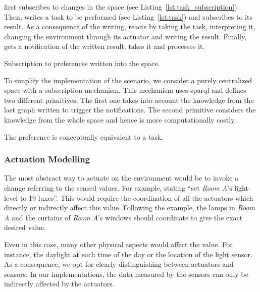 \nodeProvSpace{} first subscribes to changes in the space (see Listing~\ref{lst:task_subscription}).
Then, \nodeConsSpace{} writes a task to be performed (see Listing~\ref{lst:task}) and subscribes to its result.
As a consequence of the writing, \nodeProvSpace{} reacts by taking the task, interpreting it, changing the environment through its actuator and writing the result.
Finally, \nodeConsSpace{} gets a notification of the written result, takes it and processes it.


\begin{listing}
  
  \caption{Subscription to preferences written into the space.}
  \label{lst:task_subscription}
\end{listing}


To simplify the implementation of the scenario, we consider a purely centralized space with a subscription mechanism.
This mechanism uses \acs{sparql}  and defines two different primitives.
The first one takes into account the knowledge from the last graph written to trigger the notifications.
The second primitive considers the knowledge from the whole space and hence is more computationally costly.


\begin{listing}
  
  \caption{The preference is conceptually equivalent to a task.}
  \label{lst:task}
\end{listing}



\subsubsection{Actuation Modelling}

The most abstract way to actuate on the environment would be to invoke a change referring to the sensed values.
For example, stating ``set \emph{Room A}'s light-level to 19 luxes''.
This would require the coordination of all the actuators which directly or indirectly affect this value.
Following the example, the lamps in \emph{Room A} and the curtains of \emph{Room A}'s windows should coordinate to give the exact desired value.


Even in this case, many other physical aspects would affect the value.
For instance, the daylight at each time of the day or the location of the light sensor.
As a consequence, we opt for clearly distinguishing between actuators and sensors.
In our implementations, the data measured by the sensors can only be indirectly affected by the actuators.


